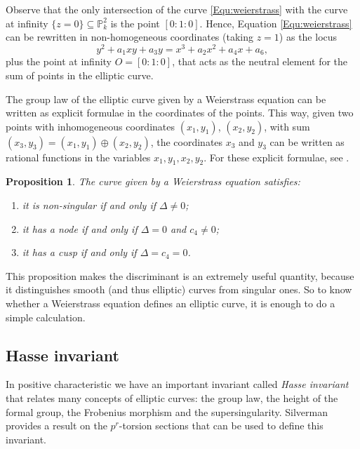 \documentclass{report}
\newtheorem{proposition}[theorem]{Proposition}
\theoremstyle{definition}
\begin{document}
Observe that the only intersection of the curve \eqref{Equ:weierstrass} with the curve at infinity $\{z=0\}\subseteq\mathbb{P}_k^2$ is the point $[0:1:0]$. Hence, Equation \eqref{Equ:weierstrass} can be rewritten in non-homogeneous coordinates (taking $z=1$) as the locus
\begin{equation}
\label{eq:weierstrass-no-homo}
y^2+a_1xy+a_3y=x^3+a_2x^2+a_4x+a_6,
\end{equation}
plus the point at infinity $O=[0:1:0]$, that acts as the neutral element for the sum of points in the elliptic curve.

The group law of the elliptic curve given by a Weierstrass equation can be written as explicit formulae in the coordinates of the points. This way, given two points with inhomogeneous coordinates $(x_1,y_1)$, $(x_2,y_2)$, with sum $(x_3,y_3)=(x_1,y_1)\oplus(x_2,y_2)$, the coordinates $x_3$ and $y_3$ can be written as rational functions in the variables $x_1,y_1,x_2,y_2$. For these explicit formulae, see \cite[Group Law Algorithm~III.2.3]{silverman2009arithmetic}.

\begin{proposition}
\label{pro:discriminant}
The curve given by a Weierstrass equation satisfies:
\begin{enumerate}
\item it is non-singular if and only if $\Delta\neq0$;
\item it has a node if and only if $\Delta=0$ and $c_4\neq0$;
\item it has a cusp if and only if $\Delta=c_4=0$.
\end{enumerate}
\end{proposition}

This proposition makes the discriminant is an extremely useful quantity, because it distinguishes smooth (and thus elliptic) curves from singular ones. So to know whether a Weierstrass equation defines an elliptic curve, it is enough to do a simple calculation.

\subsection{Hasse invariant}

In positive characteristic we have an important invariant called \emph{Hasse invariant} that relates many concepts of elliptic curves: the group law, the height of the formal group, the Frobenius morphism and the supersingularity. Silverman \cite[Theorem~V.3.1]{silverman2009arithmetic} provides a result on the $p^r$-torsion sections that can be used to define this invariant.
\end{document}
